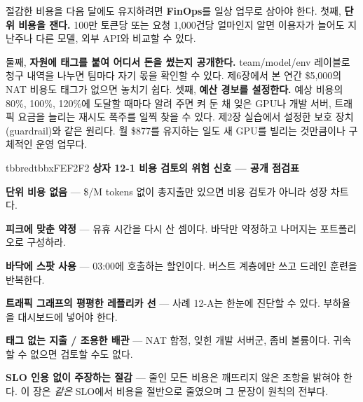절감한 비용을 다음 달에도 유지하려면 \textbf{FinOps}를 일상 업무로 삼아야 한다. 첫째, \textbf{단위 비용을 잰다.} 100만 토큰당 또는 요청 1,000건당 얼마인지 알면 이용자가 늘어도 지난주나 다른 모델, 외부 API와 비교할 수 있다.

둘째, \textbf{자원에 태그를 붙여 어디서 돈을 썼는지 공개한다.} team/model/env 레이블로 청구 내역을 나누면 팀마다 자기 몫을 확인할 수 있다. 제6장에서 본 연간 \$5,000의 NAT 비용도 태그가 없으면 놓치기 쉽다. 셋째, \textbf{예산 경보를 설정한다.} 예상 비용의 80\%, 100\%, 120\%에 도달할 때마다 알려 주면 켜 둔 채 잊은 GPU나 개발 서버, 트래픽 요금을 늘리는 재시도 폭주를 일찍 찾을 수 있다. 제2장 실습에서 설정한 보호 장치(guardrail)와 같은 원리다. 월 \$877를 유지하는 일도 새 GPU를 빌리는 것만큼이나 구체적인 운영 업무다.

\begin{calloutbox}{tbbred}{tbbxFEF2F2}
{\normalsize\bfseries\color{tbbx991B1B}상자 12-1  비용 검토의 위험 신호 — 공개 점검표}\par\vspace{3pt}
\begin{tbbitemize}
  \item \textbf{단위 비용 없음} — \$/M tokens 없이 총지출만 있으면 비용 검토가 아니라 성장 차트다.
  \item \textbf{피크에 맞춘 약정} — 유휴 시간을 다시 산 셈이다. 바닥만 약정하고 나머지는 포트폴리오로 구성하라.
  \item \textbf{바닥에 스팟 사용} — 03:00에 호출하는 할인이다. 버스트 계층에만 쓰고 드레인 훈련을 반복한다.
  \item \textbf{트래픽 그래프의 평평한 레플리카 선} — 사례 12-A는 한눈에 진단할 수 있다. 부하율을 대시보드에 넣어야 한다.
  \item \textbf{태그 없는 지출 / 조용한 배관} — NAT 함정, 잊힌 개발 서버군, 좀비 볼륨이다. 귀속할 수 없으면 검토할 수도 없다.
  \item \textbf{SLO 인용 없이 주장하는 절감} — 줄인 모든 비용은 깨뜨리지 않은 조항을 밝혀야 한다. 이 장은 \textit{같은} SLO에서 비용을 절반으로 줄였으며 그 문장이 원칙의 전부다.
\end{tbbitemize}
\end{calloutbox}

\vspace{3.0pt}

